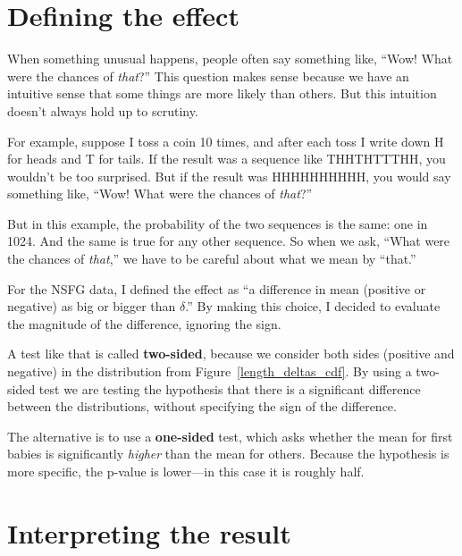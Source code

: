 \documentclass[12pt]{book}
\begin{document}
\section{Defining the effect}

When something unusual happens, people often say something like,
``Wow!  What were the chances of {\em that}?''  This question makes
sense because we have an intuitive sense that some things are more
likely than others.  But this intuition doesn't always hold up to
scrutiny.


For example, suppose I toss a coin 10 times, and after each toss I
write down H for heads and T for tails.  If the result was a sequence
like THHTHTTTHH, you wouldn't be too surprised.  But if the result was
HHHHHHHHHH, you would say something like, ``Wow!  What were the
chances of {\em that}?''

But in this example, the probability of the two sequences is the
same: one in 1024.  And the same is true for any other sequence.
So when we ask, ``What were the chances of {\em that},'' we have
to be careful about what we mean by ``that.''

For the NSFG data, I defined the effect as ``a difference in mean
(positive or negative) as big or bigger than $\delta$.''  By making
this choice, I decided to evaluate the magnitude of the difference,
ignoring the sign.


A test like that is called {\bf two-sided}, because we consider both
sides (positive and negative) in the distribution from
Figure~\ref{length_deltas_cdf}.  By using a two-sided test we are
testing the hypothesis that there is a significant difference between
the distributions, without specifying the sign of the difference.


The alternative is to use a {\bf one-sided} test, which asks whether
the mean for first babies is significantly {\em higher} than
the mean for others.  Because the hypothesis is more specific, the
p-value is lower---in this case it is roughly half.


\section{Interpreting the result}
\end{document}
